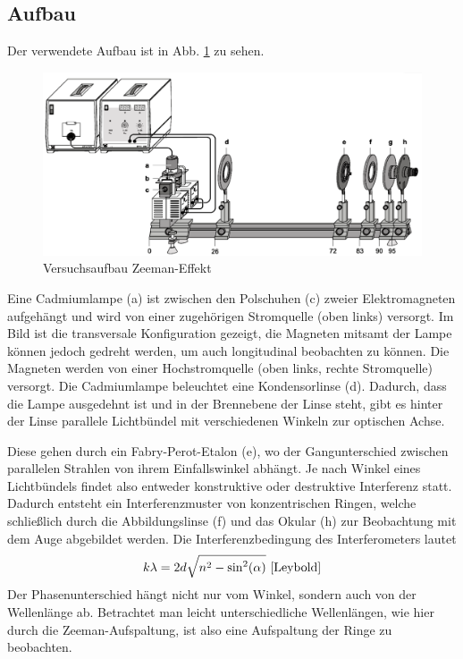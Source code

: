 \documentclass{article}
\begin{document}
\begin{multicols}{2}
\subsection{Aufbau}
Der verwendete Aufbau ist in Abb. \ref{fig:zeeman-aufbau} zu sehen.
\begin{figure}[H]
  \centering
  \includegraphics[width=\linewidth]{zeeman-aufbau}
  \caption{Versuchsaufbau Zeeman-Effekt \cite{Leybold}}
  \label{fig:zeeman-aufbau}
\end{figure}

Eine Cadmiumlampe (a) ist zwischen den Polschuhen (c) zweier Elektromagneten aufgehängt und wird von einer zugehörigen Stromquelle (oben links) versorgt. 
Im Bild ist die transversale Konfiguration gezeigt, die Magneten mitsamt der Lampe können jedoch gedreht werden,
um auch longitudinal beobachten zu können. Die Magneten werden von einer Hochstromquelle (oben links, rechte Stromquelle) versorgt.
Die Cadmiumlampe beleuchtet eine Kondensorlinse (d). Dadurch, dass die Lampe ausgedehnt ist und in der Brennebene der Linse steht,
gibt es hinter der Linse parallele Lichtbündel mit verschiedenen Winkeln zur optischen Achse.

Diese gehen durch ein Fabry-Perot-Etalon (e), wo der Gangunterschied zwischen parallelen Strahlen von ihrem Einfallswinkel abhängt.
Je nach Winkel eines Lichtbündels findet also entweder konstruktive oder destruktive Interferenz statt.
Dadurch entsteht ein Interferenzmuster von konzentrischen Ringen, welche schließlich durch die Abbildungslinse (f) und das Okular (h)
zur Beobachtung mit dem Auge abgebildet werden.
Die Interferenzbedingung des Interferometers lautet
\begin{equation}
  k\lambda = 2d\sqrt{n^2 - \sin^2(\alpha)}\ \cite{Leybold}\label{eq:fpi-interferenz}
\end{equation}
Der Phasenunterschied hängt nicht nur vom Winkel, sondern auch von der Wellenlänge ab. Betrachtet man leicht unterschiedliche
Wellenlängen, wie hier durch die Zeeman-Aufspaltung, ist also eine Aufspaltung der Ringe zu beobachten.


\end{multicols}
\end{document}
